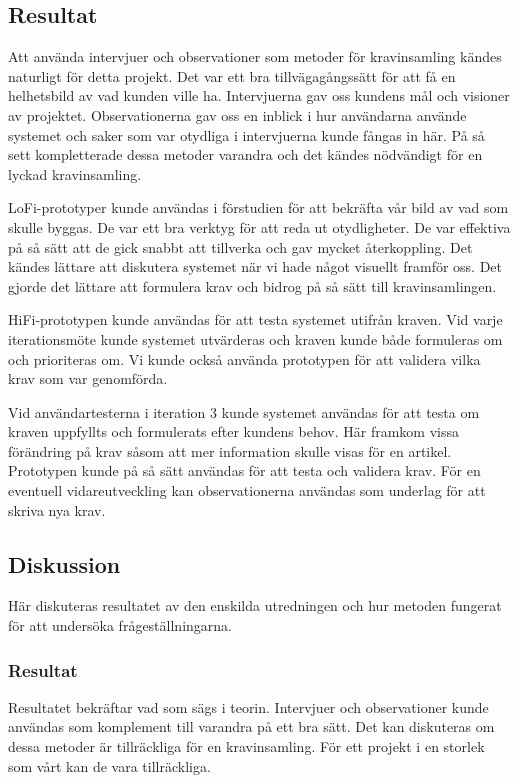 \subsection{Resultat}
Att använda intervjuer och observationer som metoder för kravinsamling kändes naturligt för detta projekt. Det var ett bra tillvägagångssätt för att få en helhetsbild av vad kunden ville ha. Intervjuerna gav oss kundens mål och visioner av projektet. Observationerna gav oss en inblick i hur användarna använde systemet och saker som var otydliga i intervjuerna kunde fångas in här. På så sett kompletterade dessa metoder varandra och det kändes nödvändigt för en lyckad kravinsamling.

LoFi-prototyper kunde användas i förstudien för att bekräfta vår bild av vad som skulle byggas. De var ett bra verktyg för att reda ut otydligheter. De var effektiva på så sätt att de gick snabbt att tillverka och gav mycket återkoppling. Det kändes lättare att diskutera systemet när vi hade något visuellt framför oss. Det gjorde det lättare att formulera krav och bidrog på så sätt till kravinsamlingen.

HiFi-prototypen kunde användas för att testa systemet utifrån kraven. Vid varje iterationsmöte kunde systemet utvärderas och kraven kunde både formuleras om och prioriteras om. Vi kunde också använda prototypen för att validera vilka krav som var genomförda. 
 
Vid användartesterna i iteration 3 kunde systemet användas för att testa om kraven uppfyllts och formulerats efter kundens behov. Här framkom vissa förändring på krav såsom att mer information skulle visas för en artikel. Prototypen kunde på så sätt användas för att testa och validera krav. För en eventuell vidareutveckling kan observationerna användas som underlag för att skriva nya krav.

\subsection{Diskussion}
Här diskuteras resultatet av den enskilda utredningen och hur metoden fungerat för att undersöka frågeställningarna.
\subsubsection{Resultat}
Resultatet bekräftar vad som sägs i teorin. Intervjuer och observationer kunde användas som komplement till varandra på ett bra sätt. Det kan diskuteras om dessa metoder är tillräckliga för en kravinsamling. För ett projekt i en storlek som vårt kan de vara tillräckliga. 


